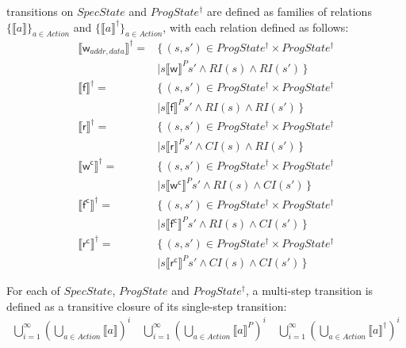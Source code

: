 \documentclass[letterpaper,twocolumn,10pt]{article}
\theoremstyle{definition}
\renewcommand{\i}[1]{\ensuremath{\mathit{#1}}}
\begin{document}
transitions on $\i{SpecState}$ and $\i{ProgState^\dagger}$ are defined as families of relations $\{ \llbracket a \rrbracket \}_\i{a \in Action}$ and $\{ \llbracket a \rrbracket^\dagger \}_\i{a \in Action}$, with each relation defined as follows:
\begin{align*}
	\llbracket \mathsf w_{addr, data} \rrbracket^\dagger ={}& \{\, (s, s') \in ProgState^\dagger \times ProgState^\dagger\\ &\mid s \llbracket \mathsf w \rrbracket^P s' \land \i{RI(s)} \land \i{RI(s')} \,\} \\
	\llbracket \mathsf f \rrbracket^\dagger ={}& \{\, (s, s') \in ProgState^\dagger \times ProgState^\dagger\\ &\mid s \llbracket \mathsf f \rrbracket^P s' \land \i{RI(s)} \land \i{RI(s')} \,\} \\
	\llbracket \mathsf r \rrbracket^\dagger ={}& \{\, (s, s') \in ProgState^\dagger \times ProgState^\dagger\\ &\mid s \llbracket \mathsf r \rrbracket^P s' \land \i{CI(s)} \land \i{RI(s')} \,\} \\
	\llbracket \mathsf {w^c} \rrbracket^\dagger ={}& \{\, (s, s') \in ProgState^\dagger \times ProgState^\dagger\\ &\mid s \llbracket \mathsf {w^c} \rrbracket^P s' \land \i{RI(s)} \land \i{CI(s')} \,\} \\
	\llbracket \mathsf {f^c} \rrbracket^\dagger ={}& \{\, (s, s') \in ProgState^\dagger \times ProgState^\dagger\\ &\mid s \llbracket \mathsf {f^c} \rrbracket^P s' \land \i{RI(s)} \land \i{CI(s')} \,\} \\
	\llbracket \mathsf {r^c} \rrbracket^\dagger ={}& \{\, (s, s') \in ProgState^\dagger \times ProgState^\dagger\\ &\mid s \llbracket \mathsf {r^c} \rrbracket^P s' \land \i{CI(s)} \land \i{CI(s')} \,\} 
\end{align*}

For each of $\i{SpecState}$, $\i{ProgState}$ and $\i{ProgState^\dagger}$, a multi-step transition is defined as a transitive closure of its single-step transition:
\begin{align*}
	\bigcup_{i=1}^\infty\left(\bigcup_{a \in Action} \llbracket a \rrbracket \right)^i \quad
	\bigcup_{i=1}^\infty\left(\bigcup_{a \in Action} \llbracket a \rrbracket^P \right)^i \quad
	\bigcup_{i=1}^\infty\left(\bigcup_{a \in Action} \llbracket a \rrbracket^\dagger \right)^i \\
\end{align*}
\end{document}
